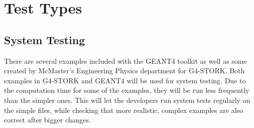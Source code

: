 \documentclass[12pt]{article}
\begin{document}
\section{Test Types}

\subsection{System Testing} %
There are several examples included with the GEANT4 toolkit as well as some created by McMaster's Engineering Physics department for G4-STORK. Both examples in G4-STORK and GEANT4 will be used for system testing. Due to the computation time for some of the examples, they will be run less frequently than the simpler ones. This will let the developers run system tests regularly on the simple files, while checking that more realistic, complex examples are also correct after bigger changes.
\end{document}

